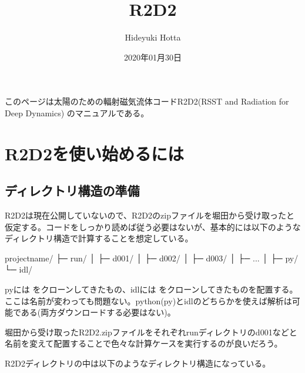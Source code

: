 \documentclass[letterpaper,10pt,dvipdfmx,report]{sphinxmanual}
\title{R2D2}
\date{2020年01月30日}
\author{Hideyuki Hotta}
\let\sphinxpxdimen\pdfpxdimen\else\newdimen\sphinxpxdimen
\begin{document}
\pagestyle{empty}
\sphinxmaketitle
\pagestyle{plain}
\sphinxtableofcontents
\pagestyle{normal}
\label{\detokenize{index::doc}}


このページは太陽のための輻射磁気流体コードR2D2(RSST and Radiation for Deep Dynamics)
のマニュアルである。


\noindent\sphinxincludegraphics[width=350\sphinxpxdimen]{{R2D2_logo_red}.png}


\chapter{R2D2を使い始めるには}
\label{\detokenize{start:r2d2}}\label{\detokenize{start::doc}}

\section{ディレクトリ構造の準備}
\label{\detokenize{start:id1}}
R2D2は現在公開していないので、R2D2のzipファイルを堀田から受け取ったと仮定する。コードをしっかり読めば従う必要はないが、基本的には以下のようなディレクトリ構造で計算することを想定している。

\begin{sphinxVerbatim}[commandchars=\\\{\}]
project\PYGZus{}name/
           ├─ run/
           │    ├─ d001/
           │    ├─ d002/
           │    ├─ d003/
           │    ├─ ...
           │
           ├─ py/
           └─ idl/
\end{sphinxVerbatim}

pyには  をクローンしてきたもの、idlには  をクローンしてきたものを配置する。ここは名前が変わっても問題ない。python(py)とidlのどちらかを使えば解析は可能である(両方ダウンロードする必要はない)。

堀田から受け取ったR2D2.zipファイルをそれぞれrunディレクトリのd001などと名前を変えて配置することで色々な計算ケースを実行するのが良いだろう。

R2D2ディレクトリの中は以下のようなディレクトリ構造になっている。
\end{document}
